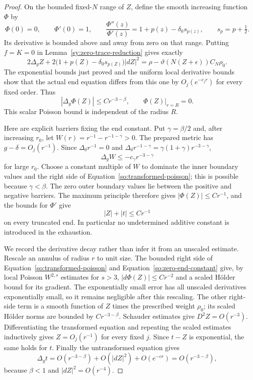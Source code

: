 \begin{proof}
On the bounded fixed-$N$ range of $Z$, define the smooth increasing
function $\Phi$ by
\begin{equation}\label{so:poisson-change}
 \Phi(0)=0,\qquad \Phi'(0)=1,\qquad
 \frac{\Phi''(z)}{\Phi'(z)}
      =1+p(z)-\delta_0s_{p(z)},\qquad s_{p}=p+\tfrac12.
\end{equation}
Its derivative is bounded above and away from zero on that range.
Putting $f=K=0$ in Lemma~\ref{sy:zero-trace-reduction} gives exactly
\[
 2\Delta_g Z+2\bigl(1+p(Z)-\delta_0s_{p(Z)}\bigr)|dZ|^2
       =\rho-\vartheta(N(Z+\epsilon))C_N\rho_0.
\]
The exponential bounds just proved and the uniform local derivative
bounds show that the actual end equation differs from this one by
$O_j(e^{-c_jr})$ for every fixed order.  Thus
\begin{equation}\label{so:transformed-poisson}
 |\Delta_g\Phi(Z)|\le C r^{-3-\beta},\qquad
 \Phi(Z)|_{r=R}=0.
\end{equation}
This scalar Poisson bound is independent of the radius $R$.

Here are explicit barriers fixing the end constant.  Put
$\gamma=\beta/2$ and, after increasing $r_0$, let
$W(r)=r^{-1}-r^{-1-\gamma}>0$.  The prepared metric has
$g-\delta=O_j(r^{-1})$.  Since
$\Delta_\delta r^{-1}=0$ and
$\Delta_\delta r^{-1-\gamma}
      =\gamma(1+\gamma)r^{-3-\gamma}$,
\[
 \Delta_g W\le-c_\gamma r^{-3-\gamma}
\]
for large $r_0$.  Choose a constant multiple of $W$ to dominate the
inner boundary values and the right side of
Equation~\ref{so:transformed-poisson}; this is possible because
$\gamma<\beta$.  The zero outer boundary values lie between the
positive and negative barriers.  The maximum principle therefore gives
$|\Phi(Z)|\le Cr^{-1}$, and the bounds for $\Phi'$ give
\begin{equation}\label{so:zero-end-constant}
 |Z|+|t|\le Cr^{-1}
\end{equation}
on every truncated end.  In particular no undetermined additive
constant is introduced in the exhaustion.

We record the derivative decay rather than infer it from an unscaled
estimate.  Rescale an annulus of radius $r$ to unit size.  The bounded
right side of Equation~\ref{so:transformed-poisson} and
Equation~\ref{so:zero-end-constant} give, by local Poisson $W^{2,s}$
estimates for $s>3$,
$|d\Phi(Z)|\le Cr^{-2}$ and a scaled H\"older bound for its gradient.
The exponentially small error has all unscaled derivatives
exponentially small, so it remains negligible after this rescaling.
The other right-side term is a smooth function of $Z$ times the
prescribed weight $\rho_0$; its scaled H\"older norms are bounded by
$Cr^{-3-\beta}$.  Schauder estimates give
$D^2Z=O(r^{-3})$.  Differentiating the transformed equation and
repeating the scaled estimates inductively gives
$Z=O_j(r^{-1})$ for every fixed $j$.  Since $t-Z$ is exponential,
the same holds for $t$.  Finally the untransformed equation gives
\[
 \Delta_g t=O(r^{-3-\beta})+O(|dZ|^2)+O(e^{-cr})
           =O(r^{-3-\beta}),
\]
because $\beta<1$ and $|dZ|^2=O(r^{-4})$.


\end{proof}
